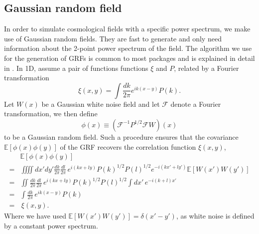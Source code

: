 \subsection{Gaussian random field}
In order to simulate cosmological fields with a specific power spectrum, we make use of Gaussian random fields. They are fast to generate and only need information about the 2-point power spectrum of the field. The algorithm we use for the generation of GRFs is common to most packages and is explained in detail in \cite{grf} \cite{grf2}. In 1D, assume a pair of functions functions $\xi$ and $P$, related by a Fourier transformation
\begin{equation*}
    \xi(x,y)=\int \frac{dk}{2\pi} e^{i k(x-y)} P(k).
\end{equation*}
Let $W(x)$ be a Gaussian white noise field and let $\mathcal{F}$ denote a Fourier transformation, we then define
\begin{equation}
    \phi(x) \equiv (\mathcal{F}^{-1} P^{1/2}\mathcal{F}W)(x)
    \label{eq:grf 1D}
\end{equation}
to be a Gaussian random field. Such a procedure ensures that the covariance $\mathbb{E}\left[\phi(x)\phi(y)\right]$ of the GRF recovers the correlation function $\xi(x,y)$,
\begin{align*}
 &\mathbb{E}\left[\phi(x)\phi(y)\right] \\
=&\iiiint dx' dy' \frac{dk}{2\pi} \frac{dl}{2\pi}  \, e^{i(kx + ly)} P(k)^{1/2} P(l)^{1/2} e^{-i(kx' + ly')} \mathbb{E}[W(x')W(y')] \\
=& \iint \frac{dk}{2\pi} \frac{dl}{2\pi} \, e^{i(kx + ly)} P(k)^{1/2} P(l)^{1/2} \int dx' \, e^{-i(k+l)x'}   \\
=& \int \frac{dk}{2\pi} \, e^{i k(x-y)} P(k)  \\
=& \, \xi(x, y).
\end{align*}
Where we have used $\mathbb{E}[W(x')W(y')] = \delta(x'-y')$, as white noise is defined by a constant power spectrum.

